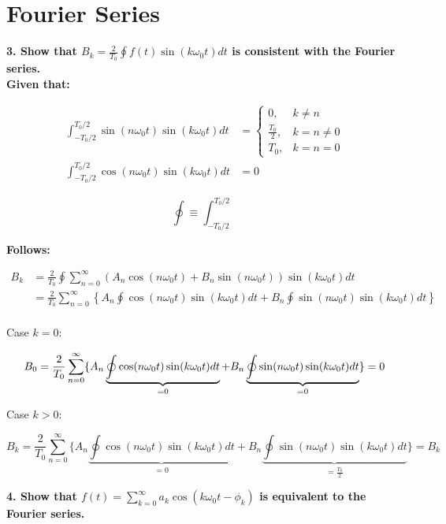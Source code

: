 \section*{Fourier Series}
\textbf{3. Show that $B_k = \frac{2}{T_0} \oint f(t) \sin(k \omega_0 t) dt$ is consistent with the Fourier series.}
\\

\textbf{Given that:}

\begin{align}
	\int_{-T_0/2}^{T_0/2} \sin(n \omega_0 t) \sin(k \omega_0 t) dt &=
	\begin{cases}
		0,& k \neq n\\
		\frac{T_0}{2},& k = n \neq 0\\
		T_0,& k = n = 0
	\end{cases}
	\\
	\int_{-T_0/2}^{T_0/2} \cos(n \omega_0 t) \sin(k \omega_0 t) dt &= 0 
\end{align}

\begin{equation}
	\oint \equiv \int_{-T_0/2}^{T_0/2}
\end{equation}

\textbf{Follows:}

\begin{align*}
	B_k &= \frac{2}{T_0} \oint \sum_{n=0}^\infty \left(A_n \cos(n \omega_0 t) + B_n \sin(n \omega_0 t) \right) \sin(k \omega_0 t) dt \\
	&= \frac{2}{T_0} \sum_{n=0}^\infty \left\{A_n \oint \cos(n \omega_0 t) \sin(k \omega_0 t) dt + B_n \oint \sin(n \omega_0 t) \sin(k \omega_0 t) dt \right\} \\
\end{align*}

Case $k = 0$:

\[
	B_0 = \frac{2}{T_0} \sum_{n=0}^\infty \{A_n \underbrace{\oint \cos(n \omega_0 t) \sin(k \omega_0 t) dt}_{=0} + B_n \underbrace{\oint \sin(n \omega_0 t) \sin(k \omega_0 t) dt}_{=0} \} = 0\\
\]

Case $k > 0$:

\[
	B_k = \frac{2}{T_0} \sum_{n=0}^\infty \{A_n \underbrace{\oint \cos(n \omega_0 t) \sin(k \omega_0 t) dt}_{=0} + B_n \underbrace{\oint \sin(n \omega_0 t) \sin(k \omega_0 t) dt}_{=\frac{T_0}{2}} \} = B_k
\]

\textbf{4. Show that $f(t) = \sum_{k=0}^\infty a_k \cos(k \omega_0 t - \phi_k)$ is equivalent to the Fourier series.}
\\

